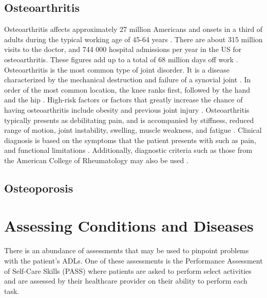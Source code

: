 \subsection{Osteoarthritis}
Osteoarthritis affects approximately 27 million Americans \cite{lespasio_hip_2018} and onsets in a third of adults during the typical working age of 45-64 years \cite{hootman_projections_2006}. There are about 315 million visits to the doctor, and 744 000 hospital admissions per year in the US for osteoarthritis. These figures add up to a total of 68 million days off work \cite{prieto-lhambra_osteoarthritis_2014}.
Osteoarthritis is the most common type of joint disorder. It is a disease characterized by the mechanical destruction and failure of a synovial joint \cite{hunter_osteoarthritis_2019}. In order of the most common location, the knee ranks first, followed by the hand and the hip \cite{hunter_osteoarthritis_2019}. High-risk factors or factors that greatly increase the chance of having osteoarthritis include obesity and previous joint injury \cite{prieto-lhambra_osteoarthritis_2014}. 
Osteoarthritis typically presents as debilitating pain, and is accompanied by stiffness, reduced range of motion, joint instability, swelling, muscle weakness, and fatigue \cite{hunter_osteoarthritis_2019}. Clinical diagnosis is based on the symptoms that the patient presents with such as pain, and functional limitations \cite{hunter_osteoarthritis_2019}. Additionally, diagnostic criteria such as those from the American College of Rheumatology may also be used \cite{hunter_osteoarthritis_2019,altman_development_1986}.


\subsection{Osteoporosis}




\section{Assessing Conditions and Diseases}

There is an abundance of assessments that may be used to pinpoint problems with the patient’s ADLs. One of these assessments is the Performance Assessment of Self-Care Skills (PASS) where patients are asked to perform select activities and are assessed by their healthcare provider on their ability to perform each task. 

